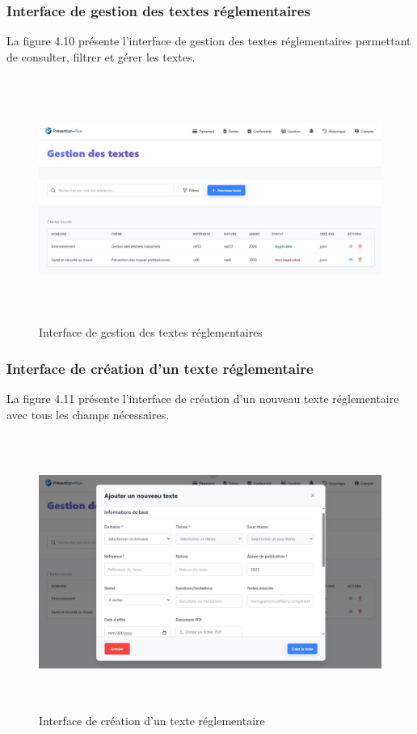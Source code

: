 \subsubsection{Interface de gestion des textes réglementaires}
\noindent La figure 4.10 présente l'interface de gestion des textes réglementaires permettant de consulter, filtrer et gérer les textes.

\begin{figure}[H]
    \centering
    \includegraphics[width=13cm,height=8cm]{images/textsinterface.PNG}
    \caption{Interface de gestion des textes réglementaires}
\end{figure}

\subsubsection{Interface de création d'un texte réglementaire}
\noindent La figure 4.11 présente l'interface de création d'un nouveau texte réglementaire avec tous les champs nécessaires.

\begin{figure}[H]
    \centering
    \includegraphics[width=13cm,height=9cm]{images/createtextmodal.PNG}
    \caption{Interface de création d'un texte réglementaire}
\end{figure}

